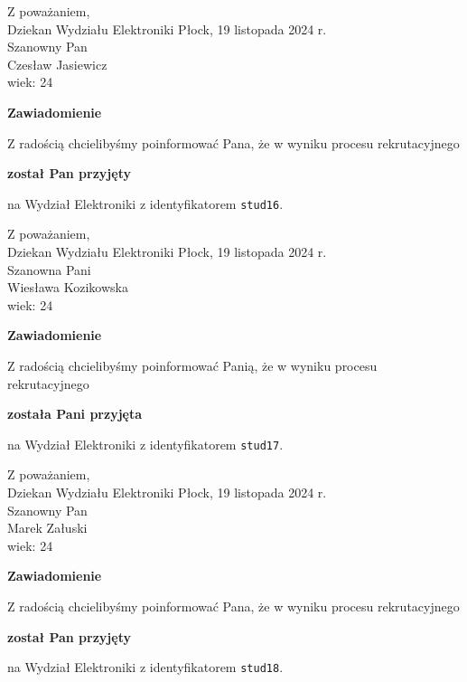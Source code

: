 \documentclass[12pt,a4paper]{article}
\begin{document}
\noindent
Z poważaniem,\\
Dziekan
Wydziału Elektroniki
\newpage
\hfill Płock, 19 listopada 2024 r.\\ 
\noindent 
Szanowny Pan \\
Czesław Jasiewicz \\
wiek: 24

\bigskip

\begin{center}
{\Large\textbf{Zawiadomienie}}
\end{center}
\bigskip
Z radością chcielibyśmy poinformować Pana, że w wyniku procesu rekrutacyjnego
\begin{center}
\textsf{\textbf{został Pan przyjęty}} 
\end{center}
na Wydział Elektroniki z identyfikatorem \verb|stud16|.
\vspace{2cm}

\noindent
Z poważaniem,\\
Dziekan
Wydziału Elektroniki
\newpage
\hfill Płock, 19 listopada 2024 r.\\ 
\noindent 
Szanowna Pani \\
Wiesława Kozikowska \\
wiek: 24

\bigskip

\begin{center}
{\Large\textbf{Zawiadomienie}}
\end{center}
\bigskip
Z radością chcielibyśmy poinformować Panią, że w wyniku procesu rekrutacyjnego
\begin{center}
\textsf{\textbf{została Pani przyjęta}} 
\end{center}
na Wydział Elektroniki z identyfikatorem \verb|stud17|.
\vspace{2cm}

\noindent
Z poważaniem,\\
Dziekan
Wydziału Elektroniki
\newpage
\hfill Płock, 19 listopada 2024 r.\\ 
\noindent 
Szanowny Pan \\
Marek Załuski \\
wiek: 24

\bigskip

\begin{center}
{\Large\textbf{Zawiadomienie}}
\end{center}
\bigskip
Z radością chcielibyśmy poinformować Pana, że w wyniku procesu rekrutacyjnego
\begin{center}
\textsf{\textbf{został Pan przyjęty}} 
\end{center}
na Wydział Elektroniki z identyfikatorem \verb|stud18|.
\vspace{2cm}
\end{document}
